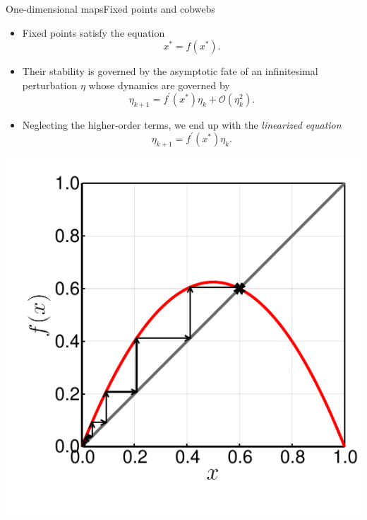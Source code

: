 \documentclass[usenames,dvipsnames,svgnames,10pt,aspectratio=169]{beamer}
\begin{document}
\begin{frame}[t, c]{One-dimensional maps}{Fixed points and cobwebs}
	\begin{minipage}{.68\textwidth}
		\begin{itemize}
			\item Fixed points satisfy the equation
			\[
				x^* = f(x^*).
			\]

			\item Their stability is governed by the asymptotic fate of an infinitesimal perturbation \( \eta \) whose dynamics are governed by
			\[
				\eta_{k+1} = f^{\prime}(x^*) \eta_k + \mathcal{O}\left( \eta_k^2 \right).
			\]

			\item Neglecting the higher-order terms, we end up with the \emph{linearized equation}
			\[
				\eta_{k+1} = f^{\prime} \left( x^* \right) \eta_k.
			\]
		\end{itemize}
	\end{minipage}%
	\hfill
	\begin{minipage}{.28\textwidth}
		\centering
		\includegraphics[width=\textwidth]{cobweb_logistic_map}
	\end{minipage}

	\vspace{1cm}
\end{frame}
\end{document}
